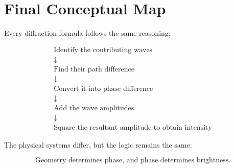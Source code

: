 \documentclass{studentnotes}
\begin{document}
\section{Final Conceptual Map}

Every diffraction formula follows the same reasoning:

\[
    \boxed{
        \begin{array}{c}
            \text{Identify the contributing waves}
            \\[0.4em]
            \downarrow
            \\[0.4em]
            \text{Find their path difference}
            \\[0.4em]
            \downarrow
            \\[0.4em]
            \text{Convert it into phase difference}
            \\[0.4em]
            \downarrow
            \\[0.4em]
            \text{Add the wave amplitudes}
            \\[0.4em]
            \downarrow
            \\[0.4em]
            \text{Square the resultant amplitude to obtain intensity}
        \end{array}
    }
\]

The physical systems differ, but the logic remains the same:

\[
    \boxed{
        \text{Geometry determines phase, and phase determines brightness.}
    }
\]
\end{document}
